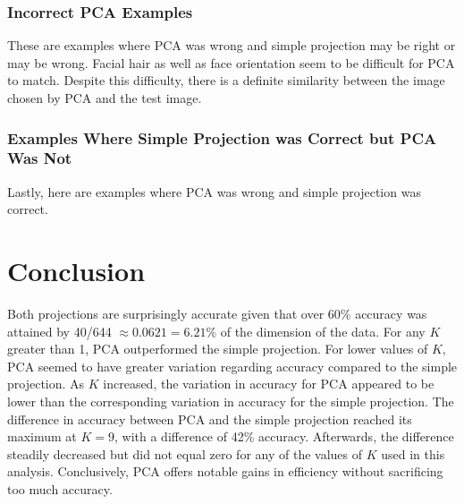 \documentclass[12pt]{article}
\begin{document}
	\subsubsection{Incorrect PCA Examples}
	These are examples where PCA was wrong and simple projection may be right or may be wrong. Facial hair as well as face orientation seem to be difficult for PCA to match. Despite this difficulty, there is a definite similarity between the image chosen by PCA and the test image. 
		\begin{center}
		\end{center}
		\begin{center}
		\end{center}

	\subsubsection{Examples Where Simple Projection was Correct but PCA Was Not}
	Lastly, here are examples where PCA was wrong and simple projection was correct. 
		\begin{center}
		\end{center}
		\begin{center}
		\end{center}
	
\section{Conclusion}
	Both projections are surprisingly accurate given that over 60\% accuracy was attained by 40/644 $ \approx 0.0621 = 6.21\% $ of the dimension of the data. For any $ K $ greater than 1, PCA outperformed the simple projection. For lower values of $ K $, PCA seemed to have greater variation regarding accuracy compared to the simple projection. As $ K $ increased, the variation in accuracy for PCA appeared to be lower than the corresponding variation in accuracy for the simple projection. The difference in accuracy between PCA and the simple projection reached its maximum at $ K=9 $, with a difference of 42\% accuracy. Afterwards, the difference steadily decreased but did not equal zero for any of the values of $ K $ used in this analysis. Conclusively, PCA offers notable gains in efficiency without sacrificing too much accuracy. 
	
	
	
\end{document}
